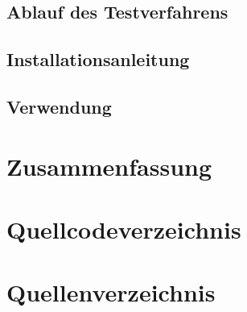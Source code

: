 \documentclass[apaper4,12p]{scrartcl}
\begin{document}
\subsection{Ablauf des Testverfahrens}
\subsection{Installationsanleitung}
\subsection{Verwendung}
\section{Zusammenfassung}
\listoffigures
\section{Quellcodeverzeichnis}
\section{Quellenverzeichnis}
\end{document}
